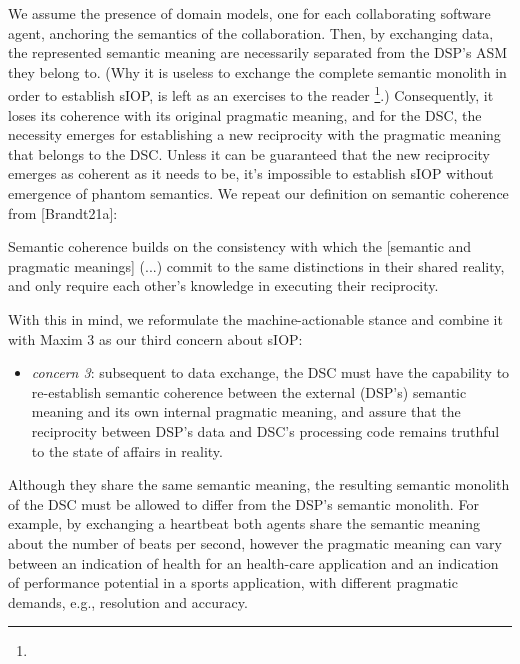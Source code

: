\documentclass[sort&compress,preprint,authoryear,3p,twocolumn]{elsarticle}
\providecommand{\tightlist}{%
  \setlength{\itemsep}{0pt}\setlength{\parskip}{0pt}}
\begin{document}
We assume the presence of domain models, one for each collaborating
software agent, anchoring the semantics of the collaboration. Then, by
exchanging data, the represented semantic meaning are necessarily
separated from the DSP's ASM they belong to. (Why it is useless to
exchange the complete semantic monolith in order to establish sIOP, is
left as an exercises to the reader \footnote{}.)
Consequently, it loses its coherence with its original pragmatic
meaning, and for the DSC, the necessity emerges for establishing a new
reciprocity with the pragmatic meaning that belongs to the DSC. Unless
it can be guaranteed that the new reciprocity emerges as coherent as it
needs to be, it's impossible to establish sIOP without emergence of
phantom semantics. We repeat our definition on semantic coherence from
{[}Brandt21a{]}:

\begin{mmdef}\label{def:semantic-coherence}
Semantic coherence builds on the consistency with which the [semantic and pragmatic meanings] (...) commit to the same distinctions in their shared reality, and only require each other's knowledge in executing their reciprocity. 
\end{mmdef}

With this in mind, we reformulate the machine-actionable stance and
combine it with Maxim 3 as our third concern about sIOP:

\begin{itemize}
\tightlist
\item
  \emph{concern 3}: subsequent to data exchange, the DSC must have the
  capability to re-establish semantic coherence between the external
  (DSP's) semantic meaning and its own internal pragmatic meaning, and
  assure that the reciprocity between DSP's data and DSC's processing
  code remains truthful to the state of affairs in reality.
\end{itemize}

Although they share the same semantic meaning, the resulting semantic
monolith of the DSC must be allowed to differ from the DSP's semantic
monolith. For example, by exchanging a heartbeat both agents share the
semantic meaning about the number of beats per second, however the
pragmatic meaning can vary between an indication of health for an
health-care application and an indication of performance potential in a
sports application, with different pragmatic demands, e.g., resolution
and accuracy.
\end{document}

